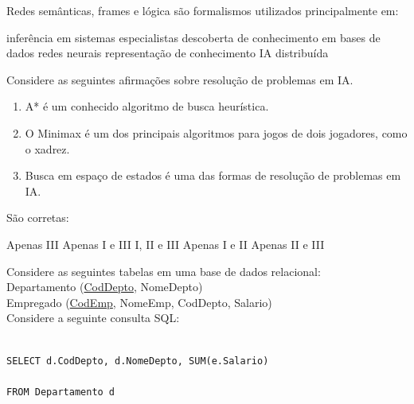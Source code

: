 \documentclass[12pt, addpoints]{exam}
\begin{document}
    \begin{questions}

    \newpage
    \question

Redes semânticas, frames e lógica são formalismos utilizados principalmente em: 
\begin{choices}
\choice inferência em sistemas especialistas
\choice descoberta de conhecimento em bases de dados
\choice redes neurais
\choice representação de conhecimento
\choice IA distribuída
\end{choices}

\question

Considere as seguintes afirmações sobre resolução de problemas em IA.

\begin{enumerate}[label=\Roman*.]

    \item A* é um conhecido algoritmo de busca heurística.

    \item O Minimax é um dos principais algoritmos para jogos de dois jogadores, como o xadrez.

    \item Busca em espaço de estados é uma das formas de resolução de problemas em IA.

\end{enumerate}

São corretas:
\begin{choices}
\choice Apenas III
\choice Apenas I e III
\choice I, II e III
\choice Apenas I e II
\choice Apenas II e III
\end{choices}

\question

Considere as seguintes tabelas em uma base de dados relacional:\\

Departamento (\underline{CodDepto}, NomeDepto)\\

Empregado (\underline{CodEmp}, NomeEmp, CodDepto, Salario)\\

Considere a seguinte consulta SQL:

\begin{verbatim}

SELECT d.CodDepto, d.NomeDepto, SUM(e.Salario)

FROM Departamento d


\end{verbatim}
\end{questions}
\end{document}
